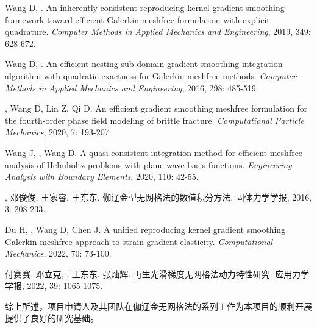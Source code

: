 \vspace{-50pt}
\begin{thebibliography}{1}
	Wang D, .
	\newblock An inherently consistent reproducing kernel gradient smoothing
	  framework toward efficient {{Galerkin}} meshfree formulation with explicit
	  quadrature.
	\newblock \emph{Computer Methods in Applied Mechanics and Engineering}, 2019,
	  349: 628-672.

	Wang D, .
	\newblock An efficient nesting sub-domain gradient smoothing integration
	  algorithm with quadratic exactness for {{Galerkin}} meshfree methods.
	\newblock \emph{Computer Methods in Applied Mechanics and Engineering}, 2016,
	  298: 485-519.

	, Wang D, Lin Z, Qi D.
	\newblock An efficient gradient smoothing meshfree formulation for the
	  fourth-order phase field modeling of brittle fracture.
	\newblock \emph{Computational Particle Mechanics}, 2020, 7: 193-207.

	Wang J, , Wang D.
	\newblock A quasi-consistent integration method for efficient meshfree analysis
	  of {{Helmholtz}} problems with plane wave basis functions.
	\newblock \emph{Engineering Analysis with Boundary Elements}, 2020, 110: 42-55.

	, 邓俊俊, 王家睿, 王东东.
	\newblock 伽辽金型无网格法的数值积分方法.
	\newblock 固体力学学报, 2016, 3: 208-233.

	Du H, , Wang D, Chen J.
	\newblock A unified reproducing kernel gradient smoothing {{Galerkin}} meshfree
	  approach to strain gradient elasticity.
	\newblock \emph{Computational Mechanics}, 2022, 70: 73-100.

	付赛赛, 邓立克, , 王东东, 张灿辉.
	\newblock 再生光滑梯度无网格法动力特性研究.
	\newblock 应用力学学报, 2022, 39: 1065-1075.

\end{thebibliography}

综上所述，项目申请人及其团队在伽辽金无网格法的系列工作为本项目的顺利开展提供了良好的研究基础。

